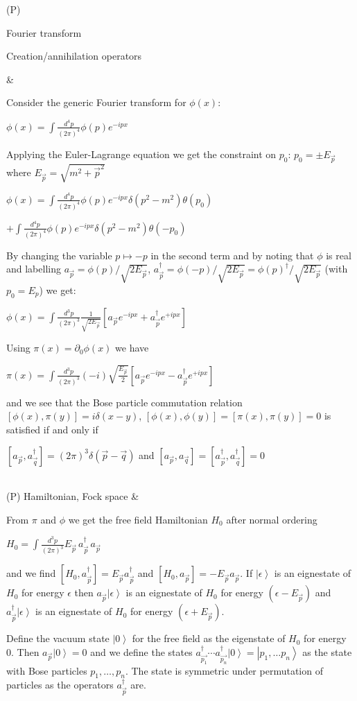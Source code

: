 \documentclass[11pt,amsmath,amssymb,latexsym]{article}
\newcommand{\toshProperty}[2]			{\hline (P) {#1} & {#2} \\}
\newcommand{\ket}[1]{\left|{#1}\right>}
\begin{document}
\toshProperty{Fourier transform

Creation/annihilation operators}{Consider the generic Fourier transform for $\phi(x)$:

\quad $\displaystyle\phi(x) = \int\frac{d^4 p}{(2\pi)^4} \phi(p)e^{-ipx}$

\smallskip

Applying the Euler-Lagrange equation we get the constraint on $p_0$: $p_0=\pm E_{\vec{p}}$ where $E_{\vec{p}}=\sqrt{m^2+\vec{p}^2}$

\quad $\displaystyle\phi(x) = \int\frac{d^4 p}{(2\pi)^4} \phi(p)e^{-ipx}\delta(p^2-m^2)\theta(p_0)$

\quad\quad $\displaystyle +\int\frac{d^4 p}{(2\pi)^4} \phi(p)e^{-ipx}\delta(p^2-m^2)\theta(-p_0)$

By changing the variable $p\mapsto -p$ in the second term and by noting that $\phi$ is real and labelling $a_{\vec{p}} = \phi(p)/\sqrt{2E_{\vec{p}}}$, $a^\dagger_{\vec{p}} = \phi(-p)/\sqrt{2E_{\vec{p}}} = \phi(p)^\dagger/\sqrt{2E_{\vec{p}}}$ (with $p_0=E_p$) we get:

\smallskip

\quad $\displaystyle\phi(x) = \int\frac{d^3 p}{(2\pi)^3} \frac{1}{\sqrt{2 E_{\vec{p}}}} \left[a_{\vec{p}} e^{-ipx}+a^\dagger_{\vec{p}} e^{+ipx}\right]$

\smallskip 

Using $\pi(x)=\partial_0 \phi(x)$ we have

\quad $\displaystyle\pi(x) = \int\frac{d^3 p}{(2\pi)^3} (-i)\sqrt{\frac{E_{\vec{p}}}{2}} \left[a_{\vec{p}} e^{-ipx}-a^\dagger_{\vec{p}} e^{+ipx}\right]$

and we see that the Bose particle commutation relation $[\phi(x),\pi(y)]=i\delta(x-y)$, $[\phi(x),\phi(y)]=[\pi(x),\pi(y)]=0$ is satisfied if and only if

\smallskip

\quad $\displaystyle \left[a_{\vec{p}}, a^\dagger_{\vec{q}}\right] = (2\pi)^3\delta(\vec{p}-\vec{q})$ \quad and \quad $\displaystyle \left[a_{\vec{p}}, a_{\vec{q}}\right] = \left[a^\dagger_{\vec{p}}, a^\dagger_{\vec{q}}\right] = 0$
}
\toshProperty{Hamiltonian, Fock space}{From $\pi$ and $\phi$ we get the free field Hamiltonian $H_0$ after normal ordering

\quad $\displaystyle H_0 = \int\frac{d^3 p}{(2\pi)^3}E_{\vec{p}}\, a^\dagger_{\vec{p}}\,a_{\vec{p}}$

and we find $\left[H_0,a^\dagger_{\vec{p}}\right] = E_{\vec{p}} a^\dagger_{\vec{p}}$ and $\left[H_0,a_{\vec{p}}\right] = -E_{\vec{p}} a_{\vec{p}}$. If $\ket{\epsilon}$ is an eignestate of $H_0$ for energy $\epsilon$ then $a_{\vec{p}}\ket{\epsilon}$ is an eignestate of $H_0$ for energy $(\epsilon-E_{\vec{p}})$ and $a^\dagger_{\vec{p}}\ket{\epsilon}$ is an eignestate of $H_0$ for energy $(\epsilon+E_{\vec{p}})$. 

\smallskip

Define the vacuum state $\ket{0}$ for the free field as the eigenstate of $H_0$ for energy 0. Then $a_{\vec{p}}\ket{0} = 0$ and we define the states $a^\dagger_{\vec{p_1}}\cdots a^\dagger_{\vec{p_n}}\ket{0} = \ket{p_1,\ldots p_n}$ as the state with Bose particles $p_1,\ldots,p_n$. The state is symmetric under permutation of particles as the operators $a^\dagger_{\vec{p}}$ are.
}
\end{document}

